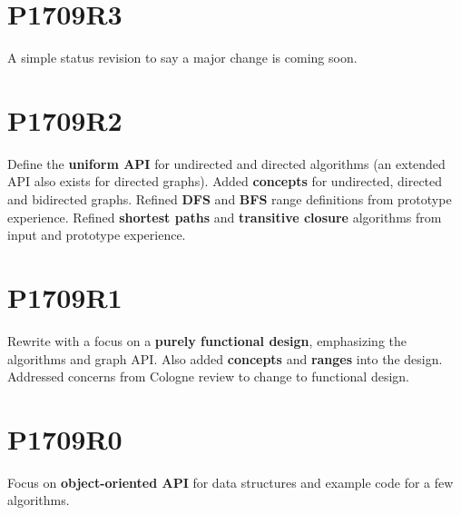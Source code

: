 \section*{P1709R3}
A simple status revision to say a major change is coming soon.

\section*{P1709R2}
Define the \textbf{uniform API} for undirected and directed algorithms (an extended API also exists for directed graphs). Added \textbf{concepts} for undirected, directed and bidirected graphs. Refined \textbf{DFS} and \textbf{BFS} range definitions from prototype experience. Refined \textbf{shortest paths} and \textbf{transitive closure} algorithms from input and prototype experience.

\section*{P1709R1}
Rewrite with a focus on a \textbf{purely functional design}, emphasizing the algorithms and graph API. Also added \textbf{concepts} and \textbf{ranges} into the design. Addressed concerns from Cologne review to change to functional design.

\section*{P1709R0}
Focus on \textbf{object-oriented API} for data structures and example code for a few algorithms.
